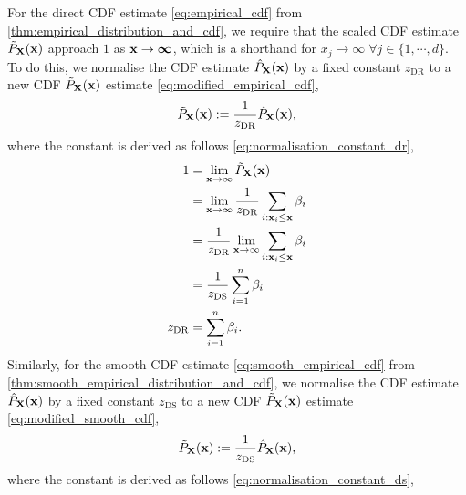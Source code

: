 \documentclass[twoside]{article} \usepackage{aistats2017}
\theoremstyle{definition}
\theoremstyle{theorem}
\newcommand{\rv}[1]{{#1}}
\begin{document}
		For the direct CDF estimate \eqref{eq:empirical_cdf} from \cref{thm:empirical_distribution_and_cdf}, we require that the scaled CDF estimate $\tilde{P}_{\bvec{\rv{X}}}(\bvec{x})$ approach $1$ as $\mathbf{x} \to \bm{\infty}$, which is a shorthand for $x_{j} \to \infty \; \forall j \in \{1, \cdots, d\}$. To do this, we normalise the CDF estimate $\hat{P}_{\bvec{\rv{X}}}(\bvec{x})$ by a fixed constant $z_{\mathrm{DR}}$ to a new CDF $\tilde{P}_{\bvec{\rv{X}}}(\bvec{x})$ estimate \eqref{eq:modified_empirical_cdf},
		\begin{equation}
			\tilde{P}_{\bvec{\rv{X}}}(\bvec{x}) := \frac{1}{z_{\mathrm{DR}}} \hat{P}_{\bvec{\rv{X}}}(\bvec{x}),
		\label{eq:modified_empirical_cdf}
		\end{equation}
		where the constant is derived as follows \eqref{eq:normalisation_constant_dr},
		\begin{equation}
			\begin{aligned}
				1 &= \lim_{\bvec{x} \to \infty} \tilde{P}_{\bvec{\rv{X}}}(\bvec{x}) \\
				&= \lim_{\bvec{x} \to \infty} \frac{1}{z_{\mathrm{DR}}} \sum_{i : \bvec{x}_{i} \leq \bvec{x}} \beta_{i} \\
				&= \frac{1}{z_{\mathrm{DR}}} \lim_{\bvec{x} \to \infty} \sum_{i : \bvec{x}_{i} \leq \bvec{x}} \beta_{i} \\
				&= \frac{1}{z_{\mathrm{DS}}} \sum_{i = 1}^{n} \beta_{i} \\
				z_{\mathrm{DR}} &= \sum_{i = 1}^{n} \beta_{i}.
			\end{aligned}
		\label{eq:normalisation_constant_dr}
		\end{equation}
		Similarly, for the smooth CDF estimate \eqref{eq:smooth_empirical_cdf} from \cref{thm:smooth_empirical_distribution_and_cdf}, we normalise the CDF estimate $\hat{P}_{\bvec{\rv{X}}}(\bvec{x})$ by a fixed constant $z_{\mathrm{DS}}$ to a new CDF $\tilde{P}_{\bvec{\rv{X}}}(\bvec{x})$ estimate \eqref{eq:modified_smooth_cdf},
		\begin{equation}
			\tilde{P}_{\bvec{\rv{X}}}(\bvec{x}) := \frac{1}{z_{\mathrm{DS}}} \hat{P}_{\bvec{\rv{X}}}(\bvec{x}),
		\label{eq:modified_smooth_cdf}
		\end{equation}
		where the constant is derived as follows \eqref{eq:normalisation_constant_ds},
\end{document}
